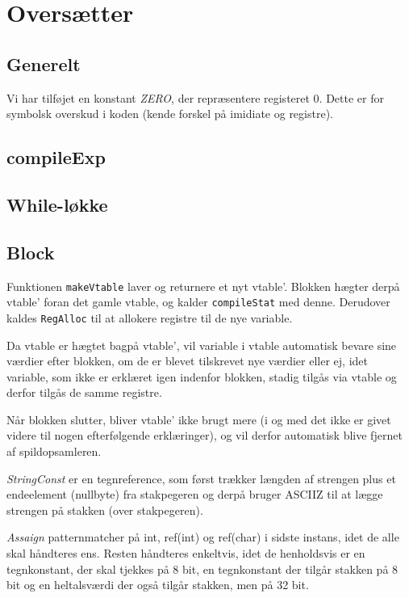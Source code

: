 \documentclass[a4paper, 10pt]{article}
\begin{document}
\section{Oversætter}

\subsection{Generelt}
Vi har tilføjet en konstant \textit{ZERO}, der repræsentere registeret 0. Dette
er for symbolsk overskud i koden (kende forskel på imidiate og registre).


\subsection{compileExp}


\subsection{While-løkke}

\subsection{Block}
Funktionen \texttt{makeVtable} laver og returnere et nyt vtable'. Blokken
hægter derpå vtable' foran det gamle vtable, og kalder \texttt{compileStat} med
denne. Derudover kaldes \texttt{RegAlloc} til at allokere registre til de nye
variable.

Da vtable er hægtet bagpå vtable', vil variable i vtable automatisk bevare
sine værdier efter blokken, om de er blevet tilskrevet nye værdier eller ej,
idet variable, som ikke er erklæret igen indenfor blokken, stadig tilgås via
vtable og derfor tilgås de samme registre.

Når blokken slutter, bliver vtable' ikke brugt mere (i og med det ikke er givet
videre til nogen efterfølgende erklæringer), og vil derfor automatisk blive
fjernet af spildopsamleren.

\textit{StringConst} er en tegnreference, som først trækker længden af strengen
plus et endeelement (nullbyte) fra stakpegeren og derpå bruger ASCIIZ til at
lægge strengen på stakken (over stakpegeren).

\textit{Assaign} patternmatcher på int, ref(int) og ref(char) i sidste instans,
idet de alle skal håndteres ens. Resten håndteres enkeltvis, idet de
henholdsvis er en tegnkonstant, der skal tjekkes på 8 bit, en tegnkonstant
der tilgår stakken på 8 bit og en heltalsværdi der også tilgår
stakken, men på 32 bit.
\end{document}
